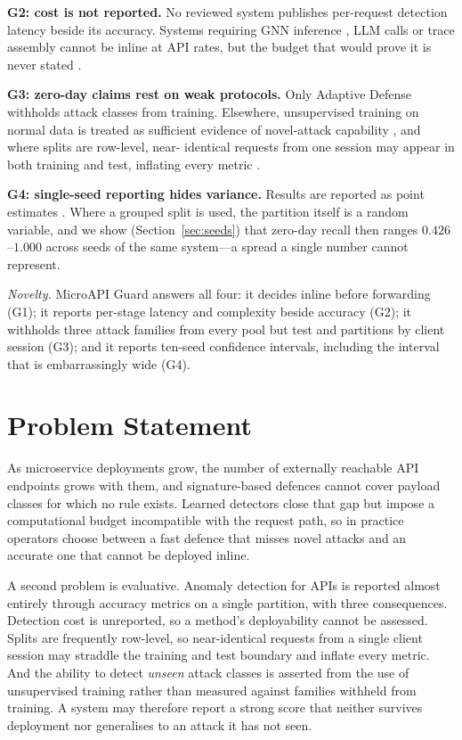\documentclass[conference]{IEEEtran}
\begin{document}
\textbf{G2: cost is not reported.} No reviewed system publishes per-request detection latency
beside its accuracy. Systems requiring GNN inference \cite{liu2024lmgd}\cite{zhang2026admm},
LLM calls \cite{pedroso2025llm} or trace assembly \cite{liu2020traceanomaly} cannot be
inline at API rates, but the budget that would prove it is never stated
\cite{faseeha2025observability}.

\textbf{G3: zero-day claims rest on weak protocols.} Only Adaptive Defense
\cite{alam2025adaptive} withholds attack classes from training. Elsewhere, unsupervised
training on normal data is treated as sufficient evidence of novel-attack capability
\cite{sadaf2020autoif}\cite{alshehari2023insider}, and where splits are row-level, near-
identical requests from one session may appear in both training and test, inflating every
metric \cite{barata2026survey}.

\textbf{G4: single-seed reporting hides variance.} Results are reported as point estimates
\cite{sadaf2020autoif}\cite{sowmya2023api}\cite{liu2024lmgd}\cite{huang2026gateway}. Where a
grouped split is used, the partition itself is a random variable, and we show
(Section~\ref{sec:seeds}) that zero-day recall then ranges $0.426$--$1.000$ across seeds of
the same system---a spread a single number cannot represent.

\textit{Novelty.} MicroAPI Guard answers all four: it decides inline before forwarding (G1);
it reports per-stage latency and complexity beside accuracy (G2); it withholds three attack
families from every pool but test and partitions by client session (G3); and it reports
ten-seed confidence intervals, including the interval that is embarrassingly wide (G4).

\section{Problem Statement}
\label{sec:prob}
As microservice deployments grow, the number of externally reachable API endpoints grows with
them, and signature-based defences cannot cover payload classes for which no rule exists.
Learned detectors close that gap but impose a computational budget incompatible with the
request path, so in practice operators choose between a fast defence that misses novel attacks
and an accurate one that cannot be deployed inline.

A second problem is evaluative. Anomaly detection for APIs is reported almost entirely through
accuracy metrics on a single partition, with three consequences. Detection cost is unreported,
so a method's deployability cannot be assessed. Splits are frequently row-level, so
near-identical requests from a single client session may straddle the training and test
boundary and inflate every metric. And the ability to detect \emph{unseen} attack classes is
asserted from the use of unsupervised training rather than measured against families withheld
from training. A system may therefore report a strong score that neither survives deployment
nor generalises to an attack it has not seen.
\end{document}
